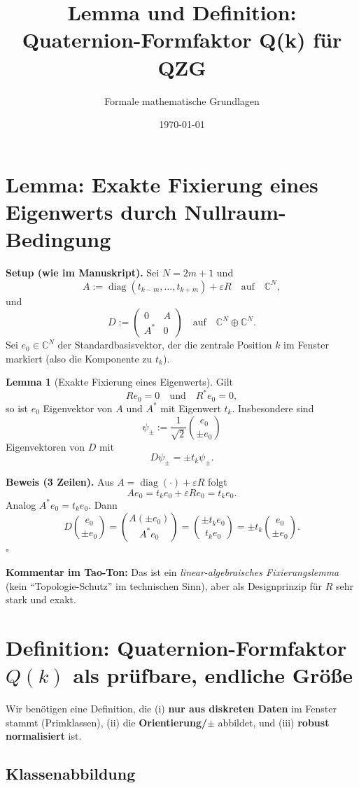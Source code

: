 \documentclass[11pt,a4paper]{article}
\title{Lemma und Definition: Quaternion-Formfaktor Q(k) für QZG}
\author{Formale mathematische Grundlagen}
\date{\today}
\theoremstyle{definition}
\newtheorem{lemma}{Lemma}[section]
\begin{document}
\maketitle

\section{Lemma: Exakte Fixierung eines Eigenwerts durch Nullraum-Bedingung}

\textbf{Setup (wie im Manuskript).} 
Sei $N=2m+1$ und
\[
A := \operatorname{diag}(t_{k-m},\dots,t_{k+m}) + \varepsilon R
\quad \text{auf}\quad \mathbb{C}^{N},
\]
und
\[
D :=\begin{pmatrix}0&A\\A^*&0\end{pmatrix}
\quad \text{auf}\quad \mathbb{C}^{N}\oplus \mathbb{C}^{N}.
\]
Sei $e_0\in\mathbb{C}^N$ der Standardbasisvektor, der die zentrale Position $k$ im Fenster markiert (also die Komponente zu $t_k$).

\begin{lemma}[Exakte Fixierung eines Eigenwerts]
Gilt
\[
R e_0=0\quad\text{und}\quad R^* e_0=0,
\]
so ist $e_0$ Eigenvektor von $A$ und $A^*$ mit Eigenwert $t_k$. Insbesondere sind
\[
\psi_\pm :=\frac{1}{\sqrt{2}}\binom{e_0}{\pm e_0}
\]
Eigenvektoren von $D$ mit
\[
D\psi_\pm=\pm t_k \psi_\pm.
\]
\end{lemma}

\textbf{Beweis (3 Zeilen).}
Aus $A=\operatorname{diag}(\cdot)+\varepsilon R$ folgt
\[
A e_0 = t_k e_0 + \varepsilon R e_0 = t_k e_0.
\]
Analog $A^* e_0 = t_k e_0$. Dann
\[
D\binom{e_0}{\pm e_0}=\binom{A(\pm e_0)}{A^* e_0}
=\binom{\pm t_k e_0}{t_k e_0}=\pm t_k \binom{e_0}{\pm e_0}.
\]
$\square$

\textbf{Kommentar im Tao-Ton:} Das ist ein \emph{linear-algebraisches Fixierungslemma} (kein ``Topologie-Schutz'' im technischen Sinn), aber als Designprinzip für $R$ sehr stark und exakt.

\section{Definition: Quaternion-Formfaktor $Q(k)$ als prüfbare, endliche Größe}

Wir benötigen eine Definition, die (i) \textbf{nur aus diskreten Daten} im Fenster stammt (Primklassen), (ii) die \textbf{Orientierung/$\pm$} abbildet, und (iii) \textbf{robust normalisiert} ist.

\subsection{Klassenabbildung}
\end{document}

